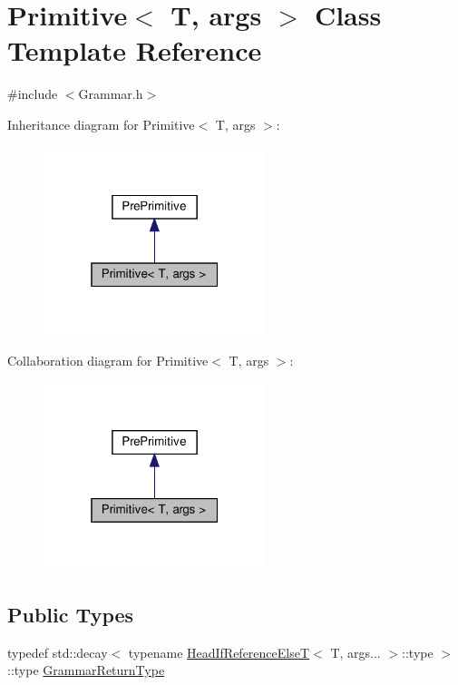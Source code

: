 \hypertarget{struct_primitive}{}\section{Primitive$<$ T, args $>$ Class Template Reference}
\label{struct_primitive}


{\ttfamily \#include $<$Grammar.\+h$>$}



Inheritance diagram for Primitive$<$ T, args $>$\+:
\nopagebreak
\begin{figure}[H]
\begin{center}
\leavevmode
\includegraphics[width=184pt]{struct_primitive__inherit__graph}
\end{center}
\end{figure}


Collaboration diagram for Primitive$<$ T, args $>$\+:
\nopagebreak
\begin{figure}[H]
\begin{center}
\leavevmode
\includegraphics[width=184pt]{struct_primitive__coll__graph}
\end{center}
\end{figure}
\subsection*{Public Types}
\begin{DoxyCompactItemize}
\item 
typedef std\+::decay$<$ typename \hyperlink{struct_head_if_reference_else_t}{Head\+If\+Reference\+ElseT}$<$ T, args... $>$\+::type $>$\+::type \hyperlink{struct_primitive_a1f2d2db3fb7869d03d65112e30d22101}{Grammar\+Return\+Type}
\end{DoxyCompactItemize}
